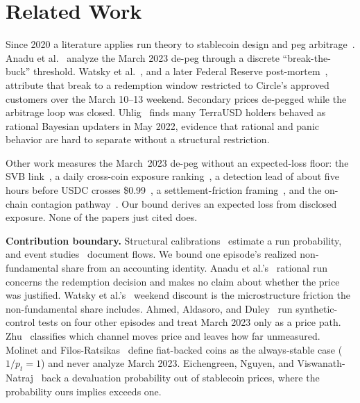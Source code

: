 \section{Related Work}
\label{sec:lit}

Since 2020 a literature applies run theory to stablecoin design and peg
arbitrage~\cite{Moin_2020,Klages_Mundt_2020,Lyons_2023,ahmed2025stablecoins}. Anadu et
al.~\cite{anadu2024} analyze the March 2023 de-peg through a discrete ``break-the-buck''
threshold. Watsky et al.~\cite{watsky2024}, and a later Federal Reserve
post-mortem~\cite{fedshadow2025}, attribute that break to a redemption window restricted
to Circle's approved customers over the March 10--13 weekend. Secondary prices de-pegged
while the arbitrage loop was closed. Uhlig~\cite{uhlig2022} finds many TerraUSD holders
behaved as rational Bayesian updaters in May 2022, evidence that rational and panic
behavior are hard to separate without a structural restriction.

Other work measures the March~2023 de-peg without an expected-loss floor: the SVB
link~\cite{galaticapalbo2023}, a daily cross-coin exposure ranking~\cite{diop2024fintech},
a detection lead of about five hours before USDC crosses
\$0.99~\cite{cintraholloway2023depegs}, a settlement-friction
framing~\cite{li2026settlementfriction}, and the on-chain contagion
pathway~\cite{sankaewtong2026contagion}. Our bound derives an expected loss from disclosed
exposure. None of the papers just cited does.

\noindent\textbf{Contribution boundary.} Structural calibrations~\cite{mzz2025} estimate a run
probability, and event studies~\cite{anadu2024} document flows. We bound one
episode's realized non-fundamental share from an accounting identity. Anadu et
al.'s~\cite{anadu2024} rational run concerns the redemption decision and makes no
claim about whether the price was justified. Watsky et al.'s~\cite{watsky2024} weekend
discount is the microstructure friction the non-fundamental share includes. Ahmed,
Aldasoro, and Duley~\cite{ahmedaldasoroduley2024} run synthetic-control tests on four
other episodes and treat March 2023 only as a price path.
Zhu~\cite{zhu2026redemptions} classifies which channel moves price and leaves
how far unmeasured. Molinet and Filos-Ratsikas~\cite{molinetfilos2026} define
fiat-backed coins as the always-stable case ($1/p_t=1$) and never analyze March 2023.
Eichengreen, Nguyen, and Viswanath-Natraj~\cite{Eichengreen_2025} back a devaluation
probability out of stablecoin prices, where the probability ours implies exceeds one.
